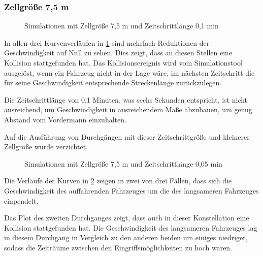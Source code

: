 \subsubsection{Zellgröße 7,5 m}

\begin{figure}[hptb]
  \centering 
   \qquad 
   \qquad 
  \caption{Simulationen mit Zellgröße 7,5 m und Zeitschrittlänge 0,1 min} 
  \label{figure:run1-3}
\end{figure}

In allen drei Kurvenverläufen in \cref{figure:run1-3} sind mehrfach Reduktionen der Geschwindigkeit auf Null zu sehen. 
Dies zeigt, dass an diesen Stellen eine Kollision stattgefunden hat. Das Kollisionsereignis wird vom Simulationstool ausgelöst, wenn ein Fahrzeug nicht in der Lage wäre, im nächsten Zeitschritt die für seine Geschwindigkeit entsprechende Streckenlänge zurückzulegen.

Die Zeitschrittlänge von 0,1 Minuten, was sechs Sekunden entspricht, ist nicht ausreichend, um Geschwindigkeit in ausreichendem Maße abzubauen, um genug Abstand vom Vordermann einzuhalten.

Auf die Ausführung von Durchgängen mit dieser Zeitschrittgröße und kleinerer Zellgröße wurde verzichtet.

\begin{figure}[hptb]
  \centering 
   \qquad 
   \qquad 
  \caption{Simulationen mit Zellgröße 7,5 m und Zeitschrittlänge 0,05 min} 
  \label{figure:run4-6}
\end{figure}

Die Verläufe der Kurven in \cref{figure:run4-6} zeigen in zwei von drei Fällen, dass sich die Geschwindigkeit des auffahrenden Fahrzeuges um die des langsameren Fahrzeuges einpendelt.

Das Plot des zweiten Durchganges zeigt, dass auch in dieser Konstellation eine Kollision stattgefunden hat.
Die Geschwindigkeit des langsameren Fahrzeuges lag in diesem Durchgang in Vergleich zu den anderen beiden um einiges niedriger, sodass die Zeiträume zwischen den Eingriffsmöglichkeiten zu hoch waren.

